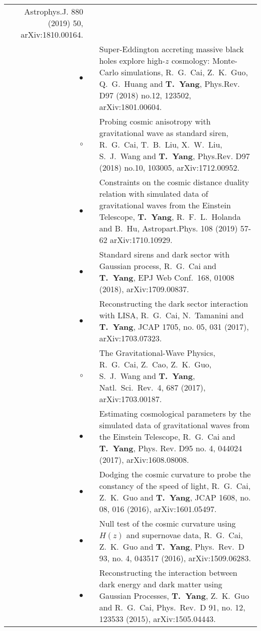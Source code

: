 \documentclass[letterpaper]{moderncv}
\begin{document}
{\begin{longtable}{rp{0.3cm}p{15.55cm}}
  Astrophys.J. 880 (2019) 50,
  arXiv:1810.00164.
\vspace{0.05cm}\\
\textbf{$\bullet$} & & Super-Eddington accreting massive black holes explore high-$z$ cosmology: Monte-Carlo simulations,
  R.~G.~Cai, Z.~K.~Guo, Q.~G.~Huang and \textbf{T.~Yang},
  Phys.Rev. D97 (2018) no.12, 123502, 
  arXiv:1801.00604.
\vspace{0.05cm}\\
\textbf{$\circ$} & & Probing cosmic anisotropy with gravitational wave as standard siren,
  R.~G.~Cai, T.~B.~Liu, X.~W.~Liu, S.~J.~Wang and \textbf{T.~Yang},  
  Phys.Rev. D97 (2018) no.10, 103005,   
  arXiv:1712.00952. 
\vspace{0.05cm}\\
\textbf{$\bullet$} & & Constraints on the cosmic distance duality relation with simulated data of gravitational waves from the Einstein Telescope,
  \textbf{T.~Yang}, R.~F.~L.~Holanda and B.~Hu,
  Astropart.Phys. 108 (2019) 57-62
  arXiv:1710.10929.
\vspace{0.05cm}\\
\textbf{$\bullet$} & & Standard sirens and dark sector with Gaussian process,
  R.~G.~Cai and \textbf{T.~Yang},
  EPJ Web Conf.\  {168}, 01008 (2018),
  arXiv:1709.00837.
\vspace{0.05cm}\\
\textbf{$\bullet$} & & Reconstructing the dark sector interaction with LISA,
  R.~G.~Cai, N.~Tamanini and \textbf{T.~Yang},
  JCAP {1705}, no. 05, 031 (2017),
  arXiv:1703.07323.
\vspace{0.05cm}\\
\textbf{$\circ$} & &  The Gravitational-Wave Physics,
  R.~G.~Cai, Z.~Cao, Z.~K.~Guo, S.~J.~Wang and \textbf{T.~Yang},
  Natl.\ Sci.\ Rev.\  {4}, 687 (2017),
  arXiv:1703.00187.
\vspace{0.05cm}\\
\textbf{$\bullet$} & & Estimating cosmological parameters by the simulated data of gravitational waves from the Einstein Telescope,
  R.~G.~Cai and \textbf{T.~Yang},
  Phys. Rev. D95 no. 4, 044024 (2017),
  arXiv:1608.08008.
\vspace{0.05cm}\\
\textbf{$\bullet$} & &  Dodging the cosmic curvature to probe the constancy of the speed of light,
  R.~G.~Cai, Z.~K.~Guo and \textbf{T.~Yang},
  JCAP {1608}, no. 08, 016 (2016),
  arXiv:1601.05497.
\vspace{0.05cm}\\
\textbf{$\bullet$} & & Null test of the cosmic curvature using $H(z)$ and supernovae data,
  R.~G.~Cai, Z.~K.~Guo and \textbf{T.~Yang},
  Phys.\ Rev.\ D {93}, no. 4, 043517 (2016),
  arXiv:1509.06283.
\vspace{0.05cm}\\
\textbf{$\bullet$} & & Reconstructing the interaction between dark energy and dark matter using Gaussian Processes,
  \textbf{T.~Yang}, Z.~K.~Guo and R.~G.~Cai,
  Phys.\ Rev.\ D {91}, no. 12, 123533 (2015),
  arXiv:1505.04443.
\vspace{0.05cm}\\
\end{longtable}
}
\end{document}
